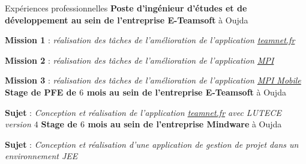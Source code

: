 \begin{rubric}{Expériences professionnelles}
%
	\textbf{Poste d'ingénieur d'études et de développement au sein de l’entreprise E-Teamsoft} à Oujda
	\par \textbf{Mission 1} : \emph{réalisation des tâches de l'amélioration de l'application \url{teamnet.fr} }
	\par \textbf{Mission 2} : \emph{réalisation des tâches de l'amélioration de l'application \url{MPI}}
	\par \textbf{Mission 3} : \emph{réalisation des tâches de l'amélioration de l'application \url{MPI Mobile} }
%
%
	\textbf{Stage de PFE de $6$ mois au sein de l’entreprise E-Teamsoft} à Oujda
	\par \textbf{Sujet} : \emph{Conception et réalisation de l'application \url{teamnet.fr} avec LUTECE version $4$}
%
%
	\textbf{Stage de $6$ mois au sein de l’entreprise Mindware} à Oujda
	\par \textbf{Sujet} : \emph{Conception et réalisation d'une application de gestion de projet dans un environnement JEE}
%
%
\end{rubric}
